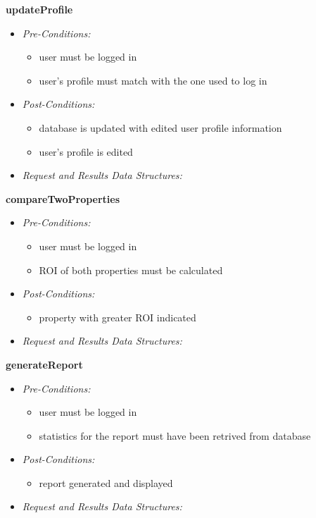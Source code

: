 \documentclass[a4paper,12pt]{article}
\begin{document}
\textbf{\large{updateProfile}}
	\begin{itemize}
		\item \textit{Pre-Conditions:}
		\begin{itemize}
			\item user must be logged in
			\item user's profile must match with the one used to log in
		\end{itemize}
		\item \textit{Post-Conditions:}
		\begin{itemize}
			\item database is updated with edited user profile information
			\item user's profile is edited
		\end{itemize}
		\item \textit{Request and Results Data Structures:}
	\end{itemize}
\textbf{\large{compareTwoProperties}}
	\begin{itemize}
		\item \textit{Pre-Conditions:}
		\begin{itemize}
			\item user must be logged in
			\item ROI of both properties must be calculated
		\end{itemize}
		\item \textit{Post-Conditions:}
		\begin{itemize}
			\item property with greater ROI indicated
		\end{itemize}
		\item \textit{Request and Results Data Structures:}
	\end{itemize}
\textbf{\large{generateReport}}
	\begin{itemize}
		\item \textit{Pre-Conditions:}
		\begin{itemize}
			\item user must be logged in
			\item statistics for the report must have been retrived from database
		\end{itemize}
		\item \textit{Post-Conditions:}
		\begin{itemize}
			\item report generated and displayed
		\end{itemize}
		\item \textit{Request and Results Data Structures:}
	\end{itemize}
\end{document}
